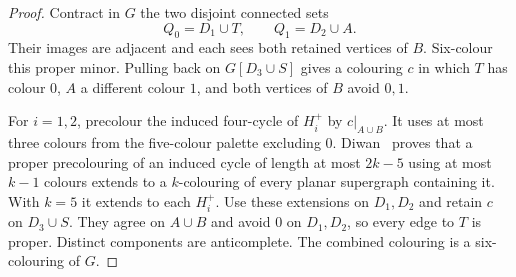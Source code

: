 \begin{proof}
Contract in $G$ the two disjoint connected sets
\[
                        Q_0=D_1\cup T,\qquad Q_1=D_2\cup A.
\]
Their images are adjacent and each sees both retained vertices of $B$.
Six-colour this proper minor.  Pulling back on $G[D_3\cup S]$ gives a
colouring $c$ in which $T$ has colour $0$, $A$ a different colour $1$,
and both vertices of $B$ avoid $0,1$.

For $i=1,2$, precolour the induced four-cycle of $H_i^+$ by
$c|_{A\cup B}$.  It uses at most three colours from the five-colour
palette excluding $0$.  Diwan~\cite[Corollary~1]{Diwan2023} proves that
a proper precolouring of an induced cycle of length at most $2k-5$
using at most $k-1$ colours extends to a $k$-colouring of every planar
supergraph containing it.  With $k=5$ it extends to each $H_i^+$.
Use these extensions on $D_1,D_2$ and retain $c$ on $D_3\cup S$.
They agree on $A\cup B$ and avoid $0$ on $D_1,D_2$, so every edge to
$T$ is proper.  Distinct components are anticomplete.  The combined
colouring is a six-colouring of $G$.
\end{proof}
